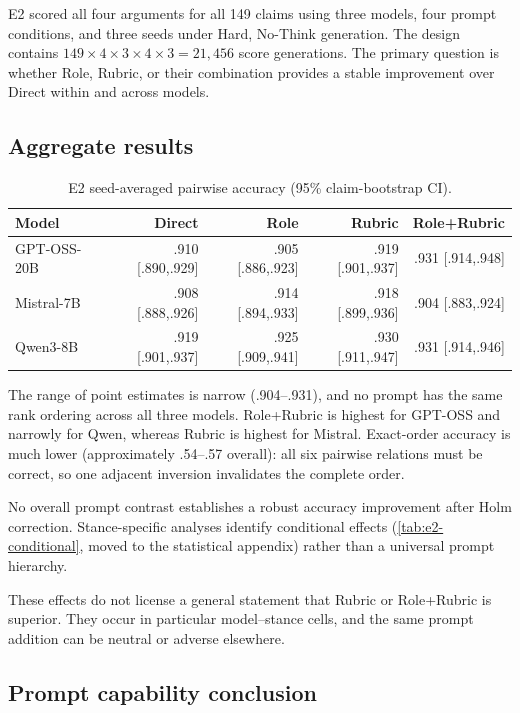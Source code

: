 \documentclass[11pt,twoside,a4paper]{report}
\begin{document}
E2 scored all four arguments for all 149 claims using three models, four prompt
conditions, and three seeds under Hard, No-Think generation.  The design contains
$149\times4\times3\times4\times3=21{,}456$ score generations.  The primary question
is whether Role, Rubric, or their combination provides a stable improvement over
Direct within and across models.

\subsection{Aggregate results}

\begin{table}[htbp]
\centering
\caption{E2 seed-averaged pairwise accuracy (95\% claim-bootstrap CI).}
\label{tab:e2-accuracy}
\begin{tabular}{lrrrr}
\toprule
Model & Direct & Role & Rubric & Role+Rubric \\
\midrule
GPT-OSS-20B & .910 [.890,.929] & .905 [.886,.923] & .919 [.901,.937] & .931 [.914,.948] \\
Mistral-7B & .908 [.888,.926] & .914 [.894,.933] & .918 [.899,.936] & .904 [.883,.924] \\
Qwen3-8B & .919 [.901,.937] & .925 [.909,.941] & .930 [.911,.947] & .931 [.914,.946] \\
\bottomrule
\end{tabular}
\end{table}

The range of point estimates is narrow (.904--.931), and no prompt has the same rank
ordering across all three models.  Role+Rubric is highest for GPT-OSS and narrowly
for Qwen, whereas Rubric is highest for Mistral.  Exact-order accuracy is much lower
(approximately .54--.57 overall): all six pairwise relations must be correct, so one
adjacent inversion invalidates the complete order.

No overall prompt contrast establishes a robust accuracy improvement after Holm
correction.  Stance-specific analyses identify conditional effects
(\cref{tab:e2-conditional}, moved to the statistical appendix) rather than a
universal prompt hierarchy.

These effects do not license a general statement that Rubric or Role+Rubric is
superior.  They occur in particular model--stance cells, and the same prompt addition
can be neutral or adverse elsewhere.

\subsection{Prompt capability conclusion}
\end{document}
